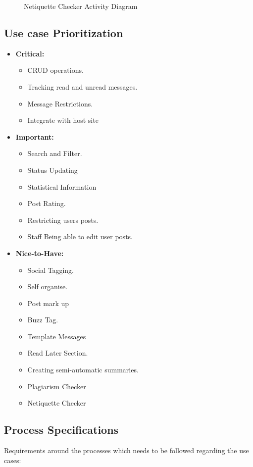 \documentclass[11pt]{article}
\begin{document}
\begin{enumerate}
\begin{itemize}
\begin{figure}[H]
	  			\caption{Netiquette Checker Activity Diagram}
	  		\end{figure}
	  	\end{itemize}

\end{enumerate}

\subsection{Use case Prioritization}
\begin{itemize}
\item \textbf{Critical: }
	\begin{itemize}
		\item CRUD operations.
		\item Tracking read and unread messages.
		\item Message Restrictions.
		\item Integrate with host site
	\end{itemize}

\item \textbf{Important: }
	\begin{itemize}
		\item Search and Filter.
		\item Status Updating
		\item Statistical Information
		\item Post Rating.
		\item Restricting users posts.
		\item Staff Being able to edit user posts.
	\end{itemize}

\item \textbf{Nice-to-Have: }
	\begin{itemize}
		\item Social Tagging.
		\item Self organise.
		\item Post mark up
		\item Buzz Tag.
		\item Template Messages 
		\item Read Later Section.
		\item Creating semi-automatic summaries.
		\item Plagiarism Checker
		\item Netiquette Checker
	\end{itemize}
\end{itemize}


\subsection{Process Specifications}
Requirements around the processes which needs to be followed regarding the use cases: \newline
\end{document}
